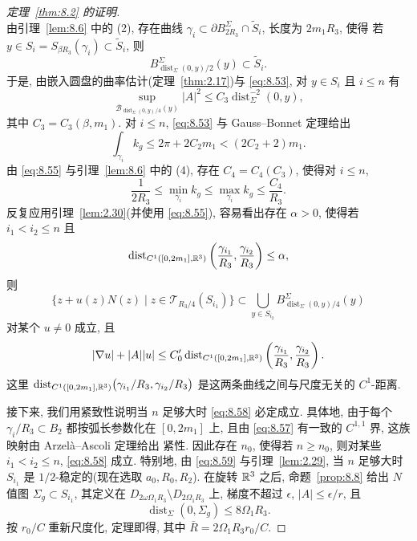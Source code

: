 \begin{proof}[定理~\ref{thm:8.2} 的证明]
\begin{equation}
\label{eq:8.53}
\end{equation}
由引理~\ref{lem:8.6} 中的 (2), 存在曲线
$\gamma_i\subset\partial B_{2R_3}^\Sigma\cap\tilde S_i$, 长度为 $2m_1R_3$, 使得
若 $y\in S_i=S_{\beta R_3}(\gamma_i)\subset\tilde S_i$, 则
\begin{equation}
B_{\operatorname{dist}_\Sigma(0,y)/2}^\Sigma(y)\subset\tilde S_i.
\label{eq:8.54}
\end{equation}
于是, 由嵌入圆盘的曲率估计(定理~\ref{thm:2.17})与 \eqref{eq:8.53}, 对
$y\in S_i$ 且 $i\leq n$ 有
\begin{equation}
\sup_{\mathcal{B}_{\operatorname{dist}_\Sigma(0,y)/4}(y)}|A|^2
\leq C_3\operatorname{dist}_\Sigma^{-2}(0,y),
\label{eq:8.55}
\end{equation}
其中 $C_3=C_3(\beta,m_1)$. 对 $i\leq n$, \eqref{eq:8.53} 与 Gauss--Bonnet
定理给出
\begin{equation}
\int_{\gamma_i}k_g\leq2\pi+2C_2m_1<(2C_2+2)m_1.
\label{eq:8.56}
\end{equation}
由 \eqref{eq:8.55} 与引理~\ref{lem:8.6} 中的 (4), 存在
$C_4=C_4(C_3)$, 使得对 $i\leq n$,
\begin{equation}
\frac1{2R_3}\leq\min_{\gamma_i}k_g\leq\max_{\gamma_i}k_g\leq\frac{C_4}{R_3}.
\label{eq:8.57}
\end{equation}
反复应用引理~\ref{lem:2.30}(并使用 \eqref{eq:8.55}), 容易看出存在 $\alpha>0$,
使得若 $i_1<i_2\leq n$ 且
\begin{equation}
\operatorname{dist}_{C^1([0,2m_1],\mathbb{R}^3)}
\left(\frac{\gamma_{i_1}}{R_3},\frac{\gamma_{i_2}}{R_3}\right)\leq\alpha,
\label{eq:8.58}
\end{equation}
则
\[
\{z+u(z)N(z)\mid z\in\mathcal{T}_{R_3/4}(S_{i_1})\}
\subset\bigcup_{y\in S_{i_2}}
 B_{\operatorname{dist}_\Sigma(0,y)/4}^\Sigma(y)
\]
对某个 $u\neq0$ 成立, 且
\begin{equation}
|\nabla u|+|A||u|
\leq C_0'\operatorname{dist}_{C^1([0,2m_1],\mathbb{R}^3)}
\left(\frac{\gamma_{i_1}}{R_3},\frac{\gamma_{i_2}}{R_3}\right).
\label{eq:8.59}
\end{equation}
这里 $\operatorname{dist}_{C^1([0,2m_1],\mathbb{R}^3)}
\bigl(\gamma_{i_1}/R_3,\gamma_{i_2}/R_3\bigr)$ 是这两条曲线之间与尺度无关的
$C^1$-距离.

接下来, 我们用紧致性说明当 $n$ 足够大时 \eqref{eq:8.58} 必定成立. 具体地,
由于每个 $\gamma_i/R_3\subset B_2$ 都按弧长参数化在 $[0,2m_1]$ 上, 且由
\eqref{eq:8.57} 有一致的 $C^{1,1}$ 界, 这族映射由 Arzelà--Ascoli 定理给出
紧性. 因此存在 $n_0$, 使得若 $n\geq n_0$, 则对某些 $i_1<i_2\leq n$,
\eqref{eq:8.58} 成立. 特别地, 由 \eqref{eq:8.59} 与引理~\ref{lem:2.29},
当 $n$ 足够大时 $S_{i_1}$ 是 $1/2$-稳定的(现在选取 $a_0,R_0,R_2$). 在旋转
$\mathbb{R}^3$ 之后, 命题~\ref{prop:8.8} 给出 $N$ 值图
$\Sigma_g\subset S_{i_1}$, 其定义在
$D_{2\omega\Omega_1R_3}\setminus D_{2\Omega_1R_3}$ 上, 梯度不超过 $\epsilon$,
$|A|\leq\epsilon/r$, 且
\[
\operatorname{dist}_\Sigma(0,\Sigma_g)\leq8\Omega_1R_3.
\]
按 $r_0/C$ 重新尺度化, 定理即得, 其中
$\bar R=2\Omega_1R_3r_0/C$.
\end{proof}


